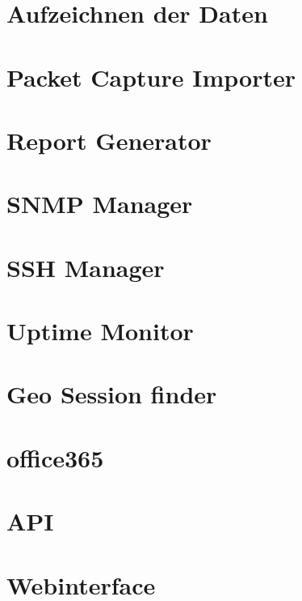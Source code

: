 \documentclass{article}
\begin{document}
	\section{Aufzeichnen der Daten}
	
	\newpage
	
	\section{Packet Capture Importer}
	
	\newpage
	
	\section{Report Generator}
	
	\newpage
	
	
	\section{SNMP Manager}
	
	\newpage
	
	\section{SSH Manager}
	
	\newpage
	
	\section{Uptime Monitor}
	
	\newpage
	
	\section{Geo Session finder}
	
	\newpage
	
	\section{office365}
	
	\newpage
	
	\section{API}
	
	\newpage
	
	\section{Webinterface}
	\newpage
\end{document}
